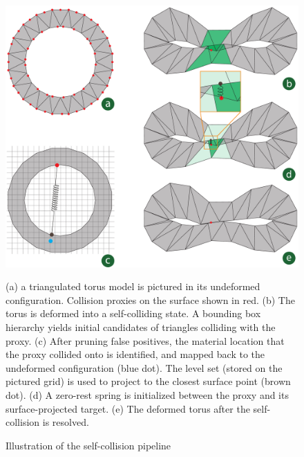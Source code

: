 \begin{figure}
  \centering
\includegraphics[width=0.95\columnwidth]{chapter_nonmanifoldlevelsets/images/torus-combined-latest.pdf}
\vspace*{-.1in}
\caption{Illustration of the self-collision pipeline}{(a) a
  triangulated torus model is pictured in its undeformed
  configuration. Collision proxies on the surface shown in red.  (b)
  The torus is deformed into a self-colliding state. A bounding box
  hierarchy yields initial candidates of triangles colliding with the
  proxy.  (c) After pruning false positives, the material location
  that the proxy collided onto is identified, and mapped back to the
  undeformed configuration (blue dot). The level set (stored on the
  pictured grid) is used to project to the closest surface point
  (brown dot).  (d) A zero-rest spring is initialized between the
  proxy and its surface-projected target.  (e) The deformed torus
  after the self-collision is resolved.}
\label{fig:self-collision-handling}
\vspace*{-.2in}
\end{figure}


